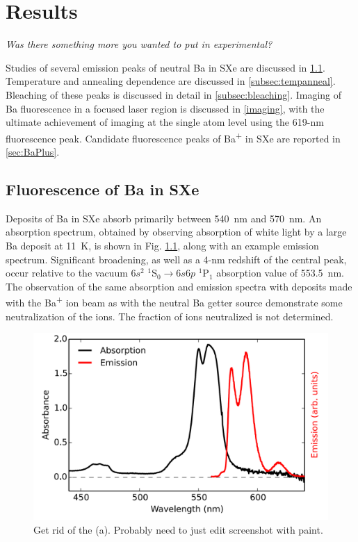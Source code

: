 \chapter{Results}

\emph{\color{gray}Was there something more you wanted to put in experimental?}

Studies of several emission peaks of neutral Ba in SXe are discussed in \ref{sec:fluorescence}.  Temperature and annealing dependence are discussed in \ref{subsec:tempanneal}.  Bleaching of these peaks is discussed in detail in \ref{subsec:bleaching}.  Imaging of Ba fluorescence in a focused laser region is discussed in \ref{imaging}, with the ultimate achievement of imaging at the single atom level using the 619-nm fluorescence peak.  Candidate fluorescence peaks of Ba\textsuperscript{+} in SXe are reported in \ref{sec:BaPlus}.

\section{Fluorescence of Ba in SXe}
\label{sec:fluorescence}

Deposits of Ba in SXe absorb primarily between 540~nm and 570~nm.  An absorption spectrum, obtained by observing absorption of white light by a large Ba deposit at 11~K, is shown in Fig. \ref{fig:BaAbs}, along with an example emission spectrum.  Significant broadening, as well as a 4-nm redshift  of the central peak, occur relative to the vacuum $6s^{2}$ $^{1}$S$_{0} \rightarrow 6s6p$ $^{1}$P$_{1}$ absorption value of 553.5~nm.  The observation of the same absorption and emission spectra with deposits made with the Ba\textsuperscript{+} ion beam as with the neutral Ba getter source demonstrate some neutralization of the ions.  The fraction of ions neutralized is not determined.  \cite{Mong2015,Shon,Brian}

\begin{figure} %
        \centering
                \includegraphics[width=.7\textwidth]{figures/BaAbs_fromBaSpec.png}
                \caption{\color{red}Get rid of the (a).  Probably need to just edit screenshot with paint.  \cite{Mong2015}}
\label{fig:BaAbs}
\end{figure}

